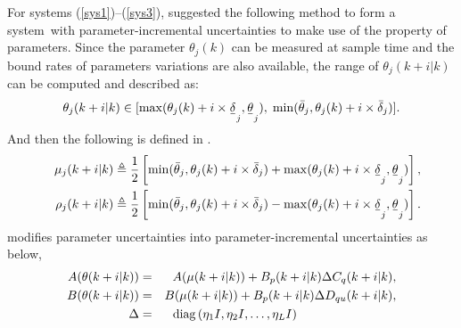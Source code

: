 \documentclass{singlecol-new}
\theoremstyle{TH}{
\newtheorem{lemma}{Lemma}
\newtheorem{theorem}[lemma]{Theorem}
\newtheorem{corrolary}[lemma]{Corrolary}
\newtheorem{conjecture}[lemma]{Conjecture}
\newtheorem{proposition}[lemma]{Proposition}
\newtheorem{claim}[lemma]{Claim}
\newtheorem{stheorem}[lemma]{Wrong Theorem}
\newtheorem{algorithm}{Algorithm}
}
\theoremstyle{THrm}{
\newtheorem{definition}{Definition}[section]
\newtheorem{question}{Question}[section]
\newtheorem{remark}{Remark}
\newtheorem{scheme}{Scheme}
}
\theoremstyle{THhit}{
\newtheorem{case}{Case}[section]
}
\begin{document}
\noindent For systems (\ref{sys1})--(\ref{sys3}), \cite{park2004crl}
suggested the following method to form a system~with
parameter-incremental uncertainties to make use of the property of
parameters. Since the parameter $\theta _j (k)$ can be measured at
sample time and the bound rates of parameters variations are also
available, the range of $\theta_j(k + i|k)$ can be computed and
described as:
\begin{eqnarray*}
\theta _j (k + i|k) \in [\max(\theta _j (k) + i \times
\underset{\raise0.3em\hbox{$\smash{\scriptscriptstyle-}$}}{\delta}
_j,\underset{\raise0.3em\hbox{$\smash{\scriptscriptstyle-}$}}{\theta}
_j),\;\min (\bar \theta _j ,\theta _j (k) + i \times \bar \delta
_j)].
\end{eqnarray*}
\noindent And then the following is defined in \cite{park2004crl}.
\begin{eqnarray}
&&\mu _j (k + i|k) \triangleq \frac{1} {2}\left[\min(\bar{\theta} _j
,\theta _j (k) +i \times {\bar{\delta}}_j) +\max(\theta _j (k) +i
\times
\underset{\raise0.3em\hbox{$\smash{\scriptscriptstyle-}$}}{\delta}_j,
\underset{\raise0.3em\hbox{$\smash{\scriptscriptstyle-}$}}{\theta}_j)\right], \nonumber\\
&&\rho _j (k + i|k) \triangleq \frac{1}{2} \left[\min
(\bar{\theta}_j ,\theta _j (k) +i \times {\bar
{\delta}}_j)-\max(\theta _j (k)  + i \times
\underset{\raise0.3em\hbox{$\smash{\scriptscriptstyle-}$}}{\delta}_j
,\underset{\raise0.3em\hbox{$\smash{\scriptscriptstyle-}$}}{\theta}_j)\right].\nonumber
\end{eqnarray}
\noindent \cite{park2004crl} modifies parameter uncertainties into
parameter-incremental uncertainties as below,
\begin{eqnarray*}\label{m1}
A(\theta (k + i|k)) &=& A(\mu (k + i|k)) + B_p (k + i|k)\Delta C_q
(k + i|k),\\B(\theta (k + i|k))&=&B(\mu (k + i|k)) + B_p (k +i|k)\Delta D_{qu} (k+ i|k),\\
\Delta &=&{\rm diag}\left( {\eta _1 I,\eta _2 I, \ldots ,\eta _L I}
\right)\hspace{8em}
\end{eqnarray*}
\end{document}
